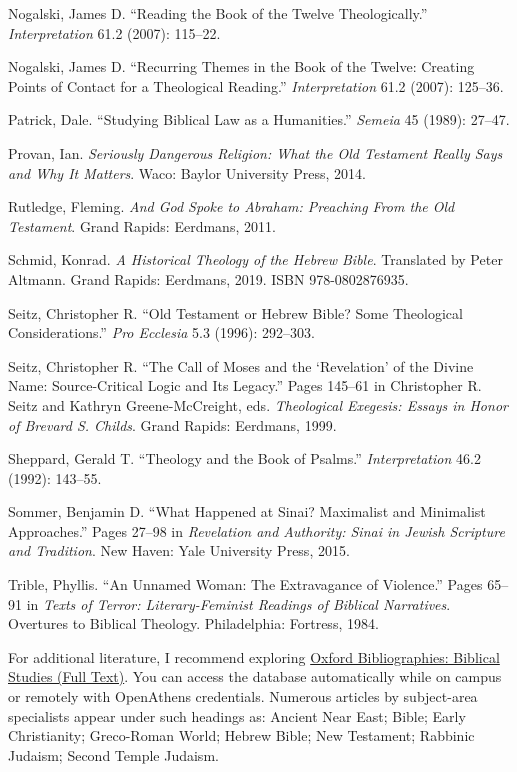 \documentclass[titlepage]{article}
\begin{document}
\begin{thebibliography}{99}
 Nogalski, James D. “Reading the Book of the Twelve Theologically.” \emph{Interpretation} 61.2 (2007): 115–22.

 Nogalski, James D. “Recurring Themes in the Book of the Twelve: Creating Points of Contact for a Theological Reading.” \emph{Interpretation} 61.2 (2007): 125–36.

 Patrick, Dale. “Studying Biblical Law as a Humanities.” \emph{Semeia} 45 (1989): 27–47.

 Provan, Ian. \emph{Seriously Dangerous Religion: What the Old Testament Really Says and Why It Matters}. Waco: Baylor University Press, 2014.

 Rutledge, Fleming. \emph{And God Spoke to Abraham: Preaching From the Old Testament}. Grand Rapids: Eerdmans, 2011.

 Schmid, Konrad. \emph{A Historical Theology of the Hebrew Bible}. Translated by Peter Altmann. Grand Rapids: Eerdmans, 2019. ISBN 978-0802876935.

 Seitz, Christopher R. “Old Testament or Hebrew Bible? Some Theological Considerations.” \emph{Pro Ecclesia} 5.3 (1996): 292–303.

 Seitz, Christopher R. “The Call of Moses and the ‘Revelation’ of the Divine Name: Source-Critical Logic and Its Legacy.” Pages 145--61 in Christopher R. Seitz and Kathryn Greene-McCreight, eds. \emph{Theological Exegesis: Essays in Honor of Brevard S. Childs}. Grand Rapids: Eerdmans, 1999.


 Sheppard, Gerald T. “Theology and the Book of Psalms.” \emph{Interpretation} 46.2 (1992): 143–55.

 Sommer, Benjamin D. “What Happened at Sinai? Maximalist and Minimalist Approaches.” Pages 27–98 in \emph{Revelation and Authority: Sinai in Jewish Scripture and Tradition}. New Haven: Yale University Press, 2015.

 Trible, Phyllis. “An Unnamed Woman: The Extravagance of Violence.” Pages 65–91 in \emph{Texts of Terror: Literary-Feminist Readings of Biblical Narratives}. Overtures to Biblical Theology. Philadelphia: Fortress, 1984.

\end{thebibliography}
\endgroup

For additional literature, I recommend exploring \href{https://go.openathens.net/redirector/astheology.ns.ca?url=https://www.oxfordbibliographies.com/obo/page/biblical-studies}{Oxford Bibliographies: Biblical Studies (Full Text)}.
You can access the database automatically while on campus or remotely
with OpenAthens credentials. Numerous articles by subject-area
specialists appear under such headings as: Ancient Near East; Bible;
Early Christianity; Greco-Roman World; Hebrew Bible; New Testament;
Rabbinic Judaism; Second Temple Judaism.
\end{document}
